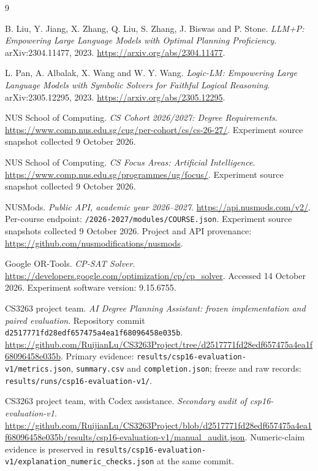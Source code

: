 \documentclass[11pt,a4paper]{article}
\newcommand{\code}[1]{\texttt{#1}}
\begin{document}
\clearpage
{}
\begin{thebibliography}{9}
\raggedright

B. Liu, Y. Jiang, X. Zhang, Q. Liu, S. Zhang, J. Biswas and P. Stone.
\emph{LLM+P: Empowering Large Language Models with Optimal Planning Proficiency}.
arXiv:2304.11477, 2023.
\url{https://arxiv.org/abs/2304.11477}.

L. Pan, A. Albalak, X. Wang and W. Y. Wang.
\emph{Logic-LM: Empowering Large Language Models with Symbolic Solvers
for Faithful Logical Reasoning}.
arXiv:2305.12295, 2023.
\url{https://arxiv.org/abs/2305.12295}.

NUS School of Computing.
\emph{CS Cohort 2026/2027: Degree Requirements}.
\url{https://www.comp.nus.edu.sg/cug/per-cohort/cs/cs-26-27/}.
Experiment source snapshot collected 9 October 2026.

NUS School of Computing.
\emph{CS Focus Areas: Artificial Intelligence}.
\url{https://www.comp.nus.edu.sg/programmes/ug/focus/}.
Experiment source snapshot collected 9 October 2026.

NUSMods.
\emph{Public API, academic year 2026--2027}.
\url{https://api.nusmods.com/v2/}.
Per-course endpoint:
\code{/2026-2027/modules/COURSE.json}.
Experiment source snapshots collected 9 October 2026.
Project and API provenance:
\url{https://github.com/nusmodifications/nusmods}.

Google OR-Tools.
\emph{CP-SAT Solver}.
\url{https://developers.google.com/optimization/cp/cp_solver}.
Accessed 14 October 2026. Experiment software version: 9.15.6755.

CS3263 project team.
\emph{AI Degree Planning Assistant: frozen implementation and paired evaluation}.
Repository commit \code{d2517771fd28edf657475a4ea1f68096458e035b}.
\url{https://github.com/RuijianLu/CS3263Project/tree/d2517771fd28edf657475a4ea1f68096458e035b}.
Primary evidence: \code{results/csp16-evaluation-v1/metrics.json},
\code{summary.csv} and \code{completion.json};
freeze and raw records: \code{results/runs/csp16-evaluation-v1/}.

CS3263 project team, with Codex assistance.
\emph{Secondary audit of csp16-evaluation-v1}.
\url{https://github.com/RuijianLu/CS3263Project/blob/d2517771fd28edf657475a4ea1f68096458e035b/results/csp16-evaluation-v1/manual_audit.json}.
Numeric-claim evidence is preserved in
\code{results/csp16-evaluation-v1/explanation\_numeric\_checks.json}
at the same commit.

\end{thebibliography}
\end{document}
